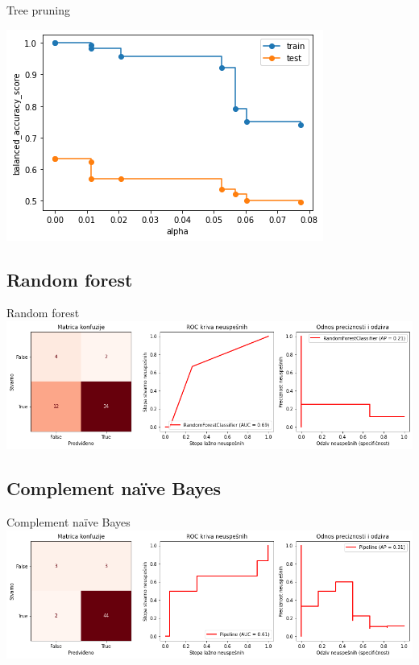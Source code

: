 \documentclass[hyperref={bookmarks=false}]{beamer}
\begin{document}
\begin{frame}{Tree pruning}
\begin{center}
    \includegraphics[width=.75\textwidth]{pruning.png}
\end{center}
\end{frame}

\subsection{Random forest}
\begin{frame}{Random forest}
\includegraphics[width=\textwidth]{forest.png}
\end{frame}

\subsection{Complement naïve Bayes}
\begin{frame}{Complement naïve Bayes}
\includegraphics[width=\textwidth]{cnb.png}
\end{frame}
\end{document}
